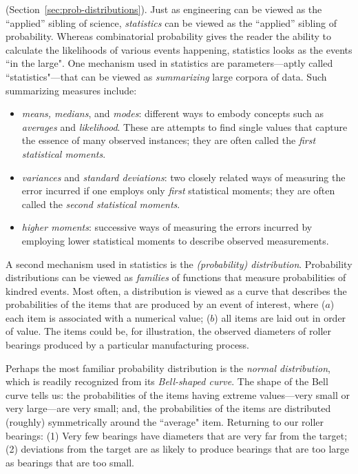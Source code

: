 \medskip


 (Section~\ref{sec:prob-distributions}).
Just as engineering can be viewed as the ``applied'' sibling of science, {\it statistics} can be viewed as the ``applied'' sibling of probability.  Whereas combinatorial probability gives the reader the ability to calculate the likelihoods of various events happening, statistics looks as the events ``in the large".  One mechanism used in statistics are parameters---aptly called ``statistics"---that can be viewed as {\em summarizing} large corpora of data.  Such summarizing measures include:
\begin{itemize}
\item
{\em means, medians}, and {\em modes}: different ways to embody concepts such as {\em averages} and {\em likelihood}.  These are attempts to find single values that capture the essence of many observed instances; they are often called the {\it first statistical moments}.
 
\medskip\item
{\em variances} and {\em standard deviations}: two closely related ways of measuring the error incurred if one employs only {\em first} statistical moments; they are often called the {\it second statistical moments}.
\medskip\item
{\em higher moments}: successive ways of measuring the errors incurred by employing lower statistical moments to describe observed measurements.
\end{itemize}
A second mechanism used in statistics is the {\em (probability) distribution}.  Probability distributions can be viewed as {\em families} of functions that measure probabilities of kindred events.  Most often, a distribution is viewed as a curve that describes the probabilities of the items that are produced by an event of interest, where ($a$) each item is associated with a numerical value; ($b$) all items are laid out in order of value.  The items could be, for illustration, the observed diameters of roller bearings produced by a particular manufacturing process.

Perhaps the most familiar probability distribution is the {\it normal distribution}, which is readily recognized from its {\it Bell-shaped curve}.  The shape of the Bell curve tells us: the probabilities of the items having extreme values---very small or very large---are very small; and, the probabilities of the items are distributed (roughly) symmetrically around the ``average" item.  Returning to our roller bearings: (1) Very few bearings have diameters that are very far from the target; (2) deviations from the target are as likely to produce bearings that are too large as bearings that are too small.

